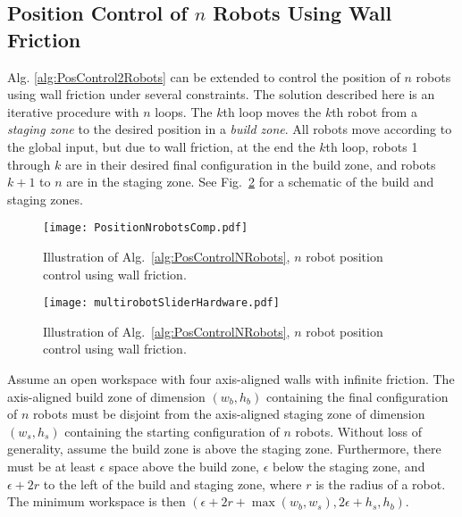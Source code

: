 \subsection{Position Control of $n$ Robots Using Wall Friction}\label{sec:PostionControlnRobots}
Alg. \ref{alg:PosControl2Robots}  can be extended to control the position of $n$ robots using wall friction under several constraints. The solution described here is an iterative procedure with $n$ loops. The $k$th loop moves the $k$th robot from a \emph{staging zone} to the desired position in a \emph{build zone}. All robots move according to the global input, but due to wall friction, at the end the $k$th loop, robots 1 through $k$ are in their desired final configuration in the build zone, and robots $k+1$ to $n$ are in the staging zone. See Fig.~\ref{fig:construction2d} for a schematic of the build and staging zones.
\begin{figure}
\begin{center}
	\texttt{[image: PositionNrobotsComp.pdf]}
\end{center}
\vspace{-1em}
\caption{\label{fig:simulationNrobot}
Illustration of Alg.\ \ref{alg:PosControlNRobots}, $n$ robot position control  using wall friction.
}
\end{figure}

\begin{figure}
\begin{center}
	\texttt{[image: multirobotSliderHardware.pdf]}
\end{center}
\vspace{-1em}
\caption{\label{fig:construction2d}
Illustration of Alg.\ \ref{alg:PosControlNRobots}, $n$ robot position control  using wall friction.
}
\end{figure}




Assume an open workspace with four axis-aligned walls with infinite friction.
The axis-aligned build zone of dimension $(w_b, h_b)$ containing the final configuration of $n$ robots must be disjoint from the axis-aligned staging zone of dimension $(w_s, h_s)$  containing the starting configuration of $n$ robots. Without loss of generality, assume the build zone  is above the staging zone. 
Furthermore, there must be at least $\epsilon$ space above the build zone, $\epsilon$ below the staging zone, and $\epsilon + 2r$ to the left of the build and staging zone, where $r$ is the radius of a robot.  The minimum workspace is then $(\epsilon + 2r + \max(w_b,w_s), 2\epsilon + h_s,h_b)$.

